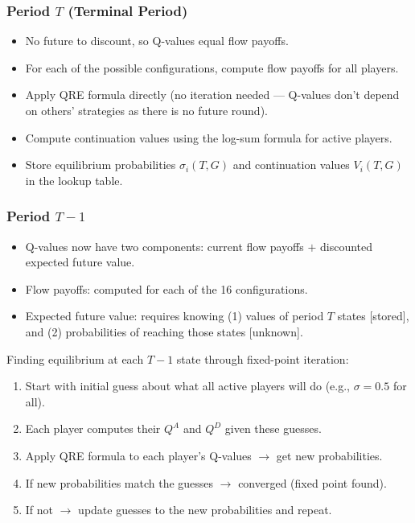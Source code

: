 \documentclass[12pt,a4paper]{article}
\begin{document}
\subsubsection*{Period $T$ (Terminal Period)}
\begin{itemize}
  \item No future to discount, so Q-values equal flow payoffs.
  \item For each of the possible configurations, compute flow payoffs for all players.
  \item Apply QRE formula directly (no iteration needed --- Q-values don't depend on others' strategies as there is no future round).
  \item Compute continuation values using the log-sum formula for active players.
  \item Store equilibrium probabilities $\sigma_i(T, G)$ and continuation values $V_i(T, G)$ in the lookup table.
\end{itemize}

\subsubsection*{Period $T - 1$}
\begin{itemize}
  \item Q-values now have two components: current flow payoffs $+$ discounted expected future value.
  \item Flow payoffs: computed for each of the 16 configurations.
  \item Expected future value: requires knowing (1) values of period $T$ states [stored], and (2) probabilities of reaching those states [unknown].
\end{itemize}

Finding equilibrium at each $T-1$ state through fixed-point iteration:
\begin{enumerate}
  \item Start with initial guess about what all active players will do (e.g., $\sigma = 0.5$ for all).
  \item Each player computes their $Q^A$ and $Q^D$ given these guesses.
  \item Apply QRE formula to each player's Q-values $\to$ get new probabilities.
  \item If new probabilities match the guesses $\to$ converged (fixed point found).
  \item If not $\to$ update guesses to the new probabilities and repeat.
\end{enumerate}
\end{document}
